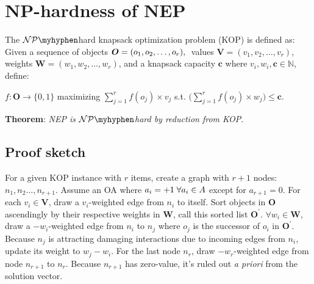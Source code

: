 

\newpage
\section{NP-hardness of NEP}\label{KOPdefinition}
    The $\mathcal{NP}\myhyphen$hard knapsack optimization problem (KOP)  \cite{karp_reducibility_2010} is defined as:
    Given a sequence of objects $\boldsymbol{O}=(o_1,o_2,\dots,o_r), \mys$ values $\boldsymbol{V}=(v_1,v_2,\dots,v_r)$,
    weights $\boldsymbol{W}=(w_1,w_2,\dots,w_r)$, and a knapsack capacity $\boldsymbol{c}$ where $v_i, w_i, \boldsymbol{c}  \in \mathbb{N}$,
    define:

    $f:\boldsymbol{O}  \rightarrow \{0,1\}$ maximizing $\sum\limits_{j=1}^{r} f(o_j)\times v_j$ s.t. $ \Bigg(  \sum\limits_{j=1}^{r} f(o_j)\times w_j  \Bigg)  \leq \boldsymbol{c}$.

    \vspace{20pt}
    \noindent\textbf{Theorem}: \textit{NEP is $\mathcal{NP}\myhyphen$hard by reduction from KOP}.
    \vspace{20pt}


\subsection{Proof sketch}\label{sup_proof_sketch}
				For a given KOP instance with $r$ items, create a graph with $r+1$ nodes: $n_1, n_2\dots, n_{r+1}$. Assume an OA where $a_i=+1 \mys \forall a_i \in  A$ except for $a_{r+1}=0$.
				For each $v_i\in\boldsymbol{V}$, draw a $v_i$-weighted edge from $n_i$ to itself.
				Sort objects in $\boldsymbol{O}$ ascendingly by their respective weights in $\boldsymbol{W}$, call this sorted
				list $\boldsymbol{O}^{\prime}$.
				$\forall w_i\in\boldsymbol{W}$, draw a $-w_i$-weighted edge from $n_i$ to $n_j$ where $o_j$ is
				the successor of $o_i$ in $\boldsymbol{O}^{\prime}$.
				Because $n_j$ is attracting damaging interactions due to incoming edges from $n_i$,
				update its weight to $w_j-w_i$.
				For the last node $n_r$, draw $-w_r$-weighted edge from node $n_{r+1}$ to $n_r$.
				Because $n_{r+1}$ has zero-value, it's ruled out \textit{a priori} from the solution vector.



\printbibliography

